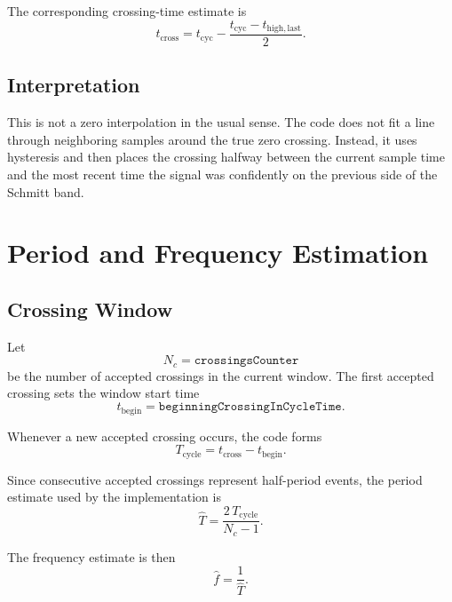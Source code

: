 \documentclass[conference]{IEEEtran}
\begin{document}
The corresponding crossing-time estimate is
\begin{equation}
  t_{\mathrm{cross}}
  =
  t_{\mathrm{cyc}}
  - \frac{t_{\mathrm{cyc}} - t_{\mathrm{high,last}}}{2}.
\end{equation}

\subsection{Interpretation}

This is not a zero interpolation in the usual sense. The code does not fit a
line through neighboring samples around the true zero crossing. Instead, it
uses hysteresis and then places the crossing halfway between the current
sample time and the most recent time the signal was confidently on the
previous side of the Schmitt band.

\section{Period and Frequency Estimation}

\subsection{Crossing Window}

Let
\begin{equation}
  N_c = \texttt{crossingsCounter}
\end{equation}
be the number of accepted crossings in the current window. The first accepted
crossing sets the window start time
\begin{equation}
  t_{\mathrm{begin}} = \texttt{beginningCrossingInCycleTime}.
\end{equation}

Whenever a new accepted crossing occurs, the code forms
\begin{equation}
  T_{\mathrm{cycle}} = t_{\mathrm{cross}} - t_{\mathrm{begin}}.
\end{equation}

Since consecutive accepted crossings represent half-period events, the period
estimate used by the implementation is
\begin{equation}\label{eq:period_est}
  \hat T = \frac{2\,T_{\mathrm{cycle}}}{N_c - 1}.
\end{equation}

The frequency estimate is then
\begin{equation}
  \hat f = \frac{1}{\hat T}.
\end{equation}
\end{document}
